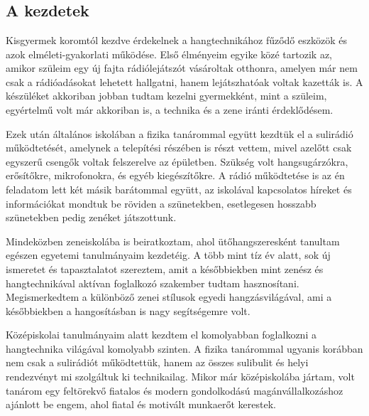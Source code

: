 \chapter{\bevezetes}

\section{A kezdetek}

Kisgyermek koromtól kezdve érdekelnek a hangtechnikához fűződő eszközök és azok elméleti-gyakorlati működése. Első élményeim egyike közé tartozik az, amikor
szüleim egy új fajta rádiólejátszót vásároltak otthonra, amelyen már nem csak a rádióadásokat lehetett hallgatni, hanem lejátszhatóak voltak kazetták is.
A készüléket akkoriban jobban tudtam kezelni gyermekként, mint a szüleim, egyértelmű volt már akkoriban is, a technika és a zene iránti érdeklődésem.

Ezek után általános iskolában a fizika tanárommal együtt kezdtük el a sulirádió működtetését, amelynek a telepítési részében is részt vettem, mivel azelőtt
csak egyszerű csengők voltak felszerelve az épületben. Szükség volt hangsugárzókra, erősítőkre, mikrofonokra, és egyéb kiegészítőkre. A rádió működtetése
is az én feladatom lett két másik barátommal együtt, az iskolával kapcsolatos híreket és információkat mondtuk be röviden a szünetekben, esetlegesen hosszabb szünetekben pedig zenéket játszottunk.

Mindeközben zeneiskolába is beiratkoztam, ahol ütőhangszeresként tanultam egészen egyetemi tanulmányaim kezdetéig. A több mint tíz év alatt, sok új ismeretet és tapasztalatot szereztem,
amit a későbbiekben mint zenész és hangtechnikával aktívan foglalkozó szakember tudtam hasznosítani. Megismerkedtem a különböző zenei stílusok egyedi hangzásvilágával, ami a későbbiekben a hangosításban is nagy segítségemre volt.

Középiskolai tanulmányaim alatt kezdtem el komolyabban foglalkozni a hangtechnika világával komolyabb szinten. 
A fizika tanárommal ugyanis korábban nem csak a sulirádiót működtettük, hanem az összes sulibulit és helyi rendezvényt mi szolgáltuk ki technikailag.
Mikor már középiskolába jártam, volt tanárom egy feltörekvő fiatalos és modern gondolkodású magánvállalkozáshoz ajánlott be engem, ahol fiatal és motivált munkaerőt kerestek.

